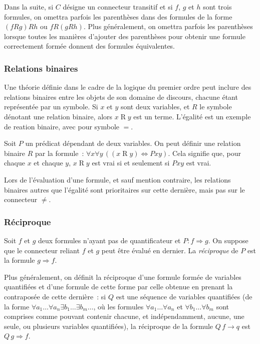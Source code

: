 Dans la suite, si $C$ désigne un connecteur transitif et si $f$, $g$ et $h$ sont trois formules, on omettra parfois les parenthèses dans des formules de la forme $(f R g) R h$ ou $f R (g R h)$. 
Plus généralement, on omettra parfois les parenthèses lorsque toutes les manières d'ajouter des parenthèses pour obtenir une formule correctement formée donnent des formules équivalentes.

\subsubsection{Relations binaires} 

Une théorie définie dans le cadre de la logique du premier ordre peut inclure des relations binaires entre les objets de son domaine de discours, chacune étant représentée par un symbole. 
Si $x$ et $y$ sont deux variables, et $R$ le symbole dénotant une relation binaire, alors $x \mathrel{R} y$ est un terme. 
L'égalité est un exemple de reation binaire, avec pour symbole $=$. 

Soit $P$ un prédicat dépendant de deux variables. 
On peut définir une relation binaire $R$ par la formule : $\forall x \forall y \, ((x \mathrel{R} y) \Leftrightarrow P x y)$. 
Cela signifie que, pour chaque $x$ et chaque $y$, $x \mathrel{R} y$ est vrai si et seulement si $P x y$ est vrai. 

Lors de l'évaluation d'une formule, et sauf mention contraire, les relations binaires autres que l'égalité sont prioritaires sur cette dernière, mais pas sur le connecteur $\neq$.

\subsubsection{Réciproque}

Soit $f$ et $g$ deux formules n'ayant pas de quantificateur et $P: f \Rightarrow g$. 
On suppose que le connecteur reliant $f$ et $g$ peut être évalué en dernier.
La \textit{réciproque} de $P$ est la formule $g \Rightarrow f$. 

Plus généralement, on définit la réciproque d'une formule formée de variables quantifiées et d'une formule de cette forme par celle obtenue en prenant la contraposée de cette dernière : si $Q$ est une séquence de variables quantifiées (de la forme $\forall a_1 \dots \forall a_n \exists b_1 \dots \exists b_m \dots$, où les formules $\forall a_1 \dots \forall a_n$ et $\forall b_1 \dots \forall b_m$ sont comprises comme pouvant contenir chacune, et indépendamment, aucune, une seule, ou plusieurs variables quantifiées), la réciproque de la formule $Q \, f \rightarrow q$ est $Q \, g \Rightarrow f$. 

